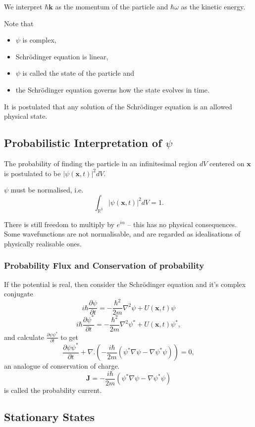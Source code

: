 \documentclass[a4paper]{article}
\newcommand{\RRR}{\mathbb{R}^{3}}
\newcommand{\pd}[2]{\frac{\partial #1}{\partial #2}}
\newcommand{\schrod}{Schr{\"o}dinger }
\newcommand{\abs}[1]{\left| #1 \right|}
\begin{document}
We interpret $\hbar \mathbf{k}$ as the momentum of the particle and
$\hbar\omega$ as the kinetic energy.

Note that
\begin{itemize}
\item $\psi$ is complex,
\item \schrod equation is linear,
\item $\psi$ is called the state of the particle and
\item the \schrod equation governs how the state evolves in time.
\end{itemize}

It is postulated that any solution of the \schrod equation is an 
allowed physical state.

\subsection{Probabilistic Interpretation of $\psi$}

The probability of finding the particle in an infinitesimal region $dV$
centered on $\mathbf{x}$ is postulated to be $\abs{\psi(\mathbf{x},t)}^2 dV$.

$\psi$ must be normalised, i.e.
\[
\int_{\RRR} \abs{\psi(\mathbf{x},t)}^2 dV = 1.
\]

There is still freedom to multiply by $e^{i\alpha}$ -- this has no
physical consequences.  Some wavefunctions are not normalisable, and are
regarded as idealisations of physically realisable ones.

\subsubsection{Probability Flux and Conservation of probability}

If the potential is real, then consider the \schrod equation and it's 
complex conjugate
\[
i\hbar \pd{\psi}{t} = -\frac{\hbar^2}{2m}\nabla^2 \psi + U(\mathbf{x},t)\psi
\]
\[
i\hbar \pd{\psi^*}{t} = -\frac{\hbar^2}{2m}\nabla^2 \psi^* + U(\mathbf{x},t)\psi^*,
\] and calculate $\pd{\psi\psi^*}{t}$ to get
\[
\pd{\psi\psi^*}{t} + \nabla . (-\frac{i\hbar}{2m}(\psi^* \nabla \psi -
\nabla \psi^* \psi)) = 0,
\] an analogue of conservation of charge.
\[\mathbf{J} = -\frac{i\hbar}{2m}(\psi^* \nabla \psi - \nabla \psi^* \psi)
\] is called the probability current.

\subsection{Stationary States}
\end{document}
